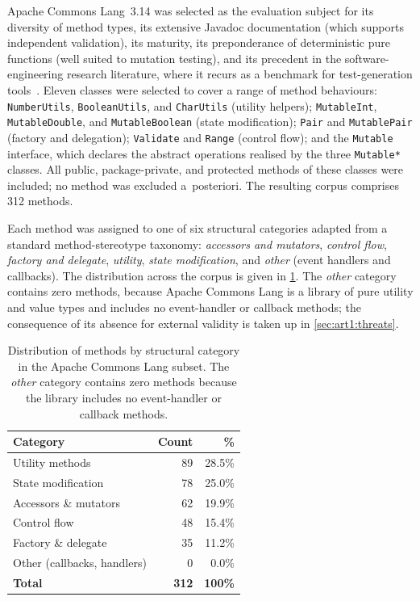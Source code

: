 Apache Commons Lang~3.14 was selected as the evaluation subject for its diversity
of method types, its extensive Javadoc documentation (which supports independent
validation), its maturity, its preponderance of deterministic pure functions
(well suited to mutation testing), and its precedent in the software-engineering
research literature, where it recurs as a benchmark for test-generation
tools~\citep{pacheco2007randoop,fraser2011evosuite}. Eleven classes were selected
to cover a range of method behaviours: \texttt{NumberUtils}, \texttt{BooleanUtils},
and \texttt{CharUtils} (utility helpers); \texttt{MutableInt},
\texttt{MutableDouble}, and \texttt{MutableBoolean} (state modification);
\texttt{Pair} and \texttt{MutablePair} (factory and delegation); \texttt{Validate}
and \texttt{Range} (control flow); and the \texttt{Mutable} interface, which
declares the abstract operations realised by the three \texttt{Mutable*} classes.
All public, package-private, and protected methods of these classes were included;
no method was excluded a~posteriori. The resulting corpus comprises 312 methods.

Each method was assigned to one of six structural categories adapted from a
standard method-stereotype taxonomy: \emph{accessors and mutators},
\emph{control flow}, \emph{factory and delegate}, \emph{utility},
\emph{state modification}, and \emph{other} (event handlers and callbacks). The
distribution across the corpus is given in \cref{tab:art1:method-distribution}.
The \emph{other} category contains zero methods, because Apache Commons Lang is a
library of pure utility and value types and includes no event-handler or callback
methods; the consequence of its absence for external validity is taken up in
\cref{sec:art1:threats}.

\begin{table}[ht]
\centering
\caption{Distribution of methods by structural category in the Apache Commons
Lang subset. The \emph{other} category contains zero methods because the library
includes no event-handler or callback methods.}
\label{tab:art1:method-distribution}
\begin{tabular}{lrr}
\toprule
\textbf{Category} & \textbf{Count} & \textbf{\%} \\
\midrule
Utility methods               & 89  & 28.5\% \\
State modification            & 78  & 25.0\% \\
Accessors \& mutators         & 62  & 19.9\% \\
Control flow                  & 48  & 15.4\% \\
Factory \& delegate           & 35  & 11.2\% \\
Other (callbacks, handlers)   & 0   & 0.0\%  \\
\midrule
\textbf{Total}                & \textbf{312} & \textbf{100\%} \\
\bottomrule
\end{tabular}
\end{table}

